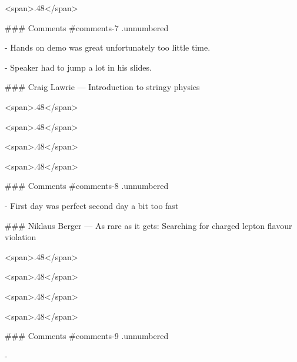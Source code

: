 <span>.48</span>

### Comments {#comments-7 .unnumbered}

-   Hands on demo was great unfortunately too little time.

-   Speaker had to jump a lot in his slides.

### Craig Lawrie — Introduction to stringy physics 

<span>.48</span>

<span>.48</span>

<span>.48</span>

<span>.48</span>

### Comments {#comments-8 .unnumbered}

-   First day was perfect second day a bit too fast

### Niklaus Berger — As rare as it gets: Searching for charged lepton flavour violation 

<span>.48</span>

<span>.48</span>

<span>.48</span>

<span>.48</span>

### Comments {#comments-9 .unnumbered}

-
